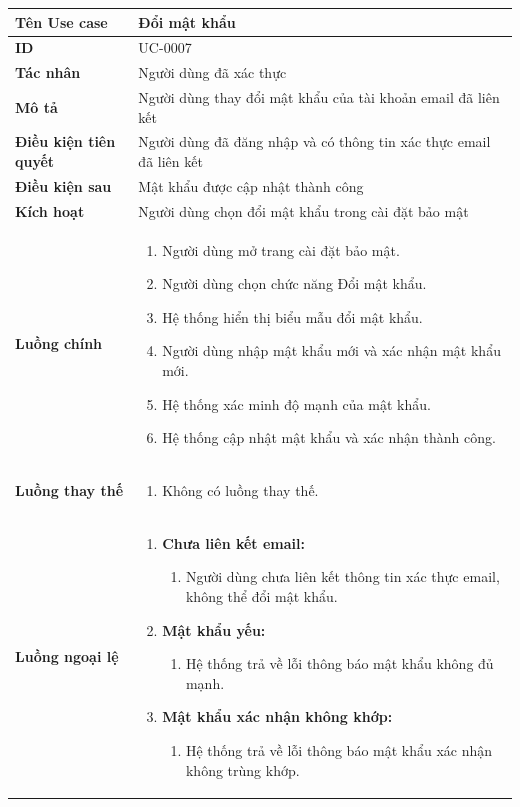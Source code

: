 {
\small
\renewcommand{\arraystretch}{1.15}

\begin{tabularx}{\textwidth}{|>{\raggedright\arraybackslash}p{3.5cm}|>{\raggedright\arraybackslash}X|}
\hline
\textbf{Tên Use case} & Đổi mật khẩu \\
\hline
\textbf{ID} & UC-0007 \\
\hline
\textbf{Tác nhân} & Người dùng đã xác thực \\
\hline
\textbf{Mô tả} & Người dùng thay đổi mật khẩu của tài khoản email đã liên kết \\
\hline
\textbf{Điều kiện tiên quyết} & Người dùng đã đăng nhập và có thông tin xác thực email đã liên kết \\
\hline
\textbf{Điều kiện sau} & Mật khẩu được cập nhật thành công \\
\hline
\textbf{Kích hoạt} & Người dùng chọn đổi mật khẩu trong cài đặt bảo mật \\
\hline
\textbf{Luồng chính} &
\begin{enumerate}
    \item Người dùng mở trang cài đặt bảo mật.
    \item Người dùng chọn chức năng Đổi mật khẩu.
    \item Hệ thống hiển thị biểu mẫu đổi mật khẩu.
    \item Người dùng nhập mật khẩu mới và xác nhận mật khẩu mới.
    \item Hệ thống xác minh độ mạnh của mật khẩu.
    \item Hệ thống cập nhật mật khẩu và xác nhận thành công.
\end{enumerate} \\
\hline
\textbf{Luồng thay thế} &
\begin{enumerate}
    \item Không có luồng thay thế.
\end{enumerate} \\
\hline
\textbf{Luồng ngoại lệ} &
\begin{enumerate}
    \item \textbf{Chưa liên kết email:}
    \begin{enumerate}
        \item[2Err.] Người dùng chưa liên kết thông tin xác thực email, không thể đổi mật khẩu.
    \end{enumerate}
    \item \textbf{Mật khẩu yếu:}
    \begin{enumerate}
        \item[5Err.] Hệ thống trả về lỗi thông báo mật khẩu không đủ mạnh.
    \end{enumerate}
    \item \textbf{Mật khẩu xác nhận không khớp:}
    \begin{enumerate}
        \item[5Err2.] Hệ thống trả về lỗi thông báo mật khẩu xác nhận không trùng khớp.
    \end{enumerate}
\end{enumerate} \\
\hline
\end{tabularx}
}
